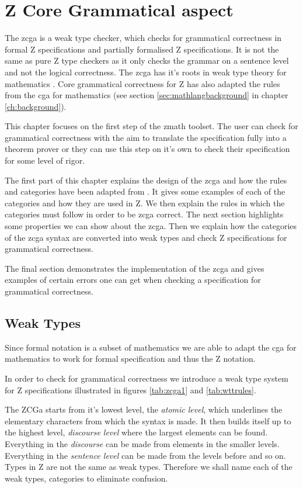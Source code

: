 \chapter{Z Core Grammatical aspect}
\label{ch:zcga}

The \gls{zcga} is a weak type checker, which checks for grammatical correctness
in formal Z specifications and partially formalised Z specifications. It is not
the same as pure Z type checkers as it only checks the grammar on a sentence
level and not the logical correctness. The \gls{zcga} has it's roots in weak
type theory for mathematics \cite{wtt}. Core grammatical correctness for Z has
also adapted the rules from the \gls{cga} for mathematics (see section
\ref{sec:mathlangbackground} in chapter \ref{ch:background}).

This chapter focuses on the first step of the \gls{zmath} toolset. The user can
check for grammatical correctness with the aim to translate the specification
fully into a theorem prover or they can use this step on it's own to check their
specification for some level of rigor.

The first part of this chapter explains the design of the \gls{zcga} and how the
rules and categories have been adapted from \cite{wtt}. It gives some examples
of each of the categories and how they are used in Z. We then explain the rules
in which the categories must follow in order to be \gls{zcga} correct. The next
section highlights some properties we can show about the \gls{zcga}. Then we
explain how the categories of the \gls{zcga} syntax are converted into weak
types and check Z specifications for grammatical correctness.

The final section demonstrates the implementation of the \gls{zcga} and gives
examples of certain errors one can get when checking a specification for
grammatical correctness.

\section{Weak Types}

Since formal notation is a subset of mathematics we are able to adapt the
\gls{cga} for mathematics to work for formal specification and thus the Z
notation.

In order to check for grammatical correctness we introduce a weak type system
for Z specifications illustrated in figures \ref{tab:zcga1} and
\ref{tab:wttrules}.
 
The ZCGa starts from it's lowest level, the \emph{atomic level}, which
underlines the elementary characters from which the syntax is made. It then
builds itself up to the highest level, \emph{discourse level} where the largest
elements can be found. Everything in the \emph{discourse} can be made from
elements in the smaller levels. Everything in the \emph{sentence level} can be
made from the levels before and so on. Types in Z are not the same as weak
types. Therefore we shall name each of the weak types, categories to eliminate
confusion.

